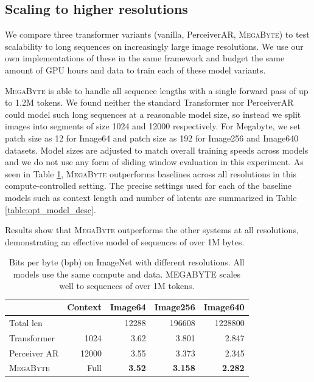 \documentclass{article}
\newcommand{\fastslow}[0]{\textsc{MegaByte}\xspace}
\newcommand{\megabyte}[0]{\fastslow}
\newcommand{\bpb}[0]{bpb\xspace}
\theoremstyle{plain}
\theoremstyle{definition}
\theoremstyle{remark}
\begin{document}
\subsection{Scaling to higher resolutions}

We compare three transformer variants (vanilla, PerceiverAR, \megabyte) to test scalability to long sequences on increasingly large image resolutions. We use our own implementations of these in the same framework and budget the same amount of GPU hours and data to train each of these model variants. 

\megabyte is able to handle all sequence lengths with a single forward pass of up to 1.2M tokens. We found neither the standard Transformer nor PerceiverAR could model such long sequences at a reasonable model size, so instead we split images into segments of size 1024 and 12000 respectively.
For Megabyte, we set patch size as 12 for Image64 and patch size as 192 for Image256 and Image640 datasets. Model sizes are adjusted to match overall training speeds across models and we do not use any form of sliding window evaluation in this experiment. As seen in Table \ref{tab:resolution_scale}, \megabyte outperforms baselines across all resolutions in this compute-controlled setting.
The precise settings used for each of the baseline models  such as context length and number of latents are summarized in Table \ref{table:opt_model_desc}.

Results show that \megabyte outperforms the other systems at all resolutions, demonstrating an effective model of sequences of over 1M bytes.

\begin{table}[t]
\centering
\small
\begin{tabular}{lrrrr}
\toprule
{} & Context & Image64 & Image256 & Image640 \\
\midrule
Total len & & 12288 & 196608 & 1228800 \\
\midrule
Transformer & 1024 & 3.62 & 3.801 & 2.847 \\
Perceiver AR & 12000 & 3.55 & 3.373 & 2.345 \\
\midrule
\megabyte & Full & \textbf{3.52} & \textbf{3.158} & \textbf{2.282} \\
\bottomrule
\end{tabular}
\caption{Bits per byte (\bpb) on ImageNet with different resolutions. All models use the same compute and data. MEGABYTE scales well to sequences of over 1M tokens.
\label{tab:resolution_scale}}
\end{table}
\end{document}
